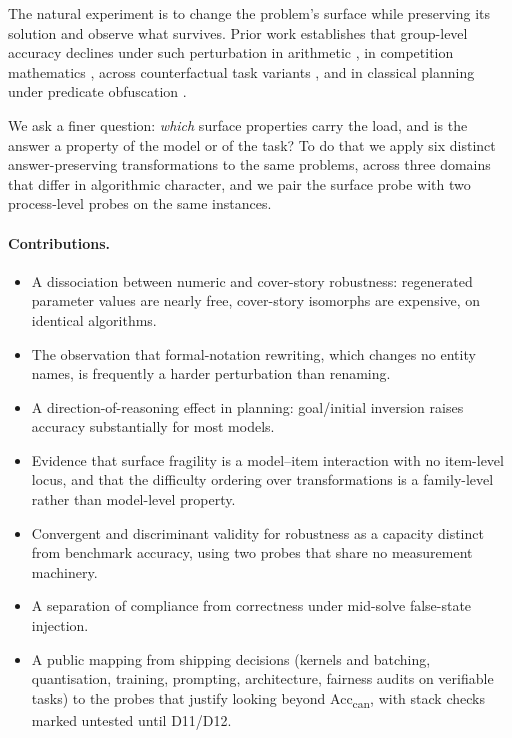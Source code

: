\documentclass{article}
\begin{document}
The natural experiment is to change the problem's surface while preserving its
solution and observe what survives. Prior work establishes that group-level accuracy
declines under such perturbation in arithmetic \citep{mirzadeh2025gsmsymbolic,
li2024gsmplus}, in competition mathematics \citep{huang2025mathperturb,
hao2025putnamgap}, across counterfactual task variants \citep{wu2024reasoning}, and
in classical planning under predicate obfuscation \citep{valmeekam2023planbench}.

We ask a finer question: \emph{which} surface properties carry the load, and is the
answer a property of the model or of the task? To do that we apply six distinct
answer-preserving transformations to the same problems, across three domains that
differ in algorithmic character, and we pair the surface probe with two
process-level probes on the same instances.

\paragraph{Contributions.}
\begin{itemize}
\item A dissociation between numeric and cover-story robustness: regenerated parameter
values are nearly free, cover-story isomorphs are expensive, on identical algorithms.
\item The observation that formal-notation rewriting, which changes no entity names,
is frequently a harder perturbation than renaming.
\item A direction-of-reasoning effect in planning: goal/initial inversion raises
accuracy substantially for most models.
\item Evidence that surface fragility is a model--item interaction with no
item-level locus, and that the difficulty ordering over transformations is a
family-level rather than model-level property.
\item Convergent and discriminant validity for robustness as a capacity distinct
from benchmark accuracy, using two probes that share no measurement machinery.
\item A separation of compliance from correctness under mid-solve false-state
injection.
\item A public mapping from shipping decisions (kernels and batching, quantisation,
training, prompting, architecture, fairness audits on verifiable tasks) to the
probes that justify looking beyond Acc\textsubscript{can}, with stack checks
marked untested until D11/D12.
\end{itemize}
\end{document}
